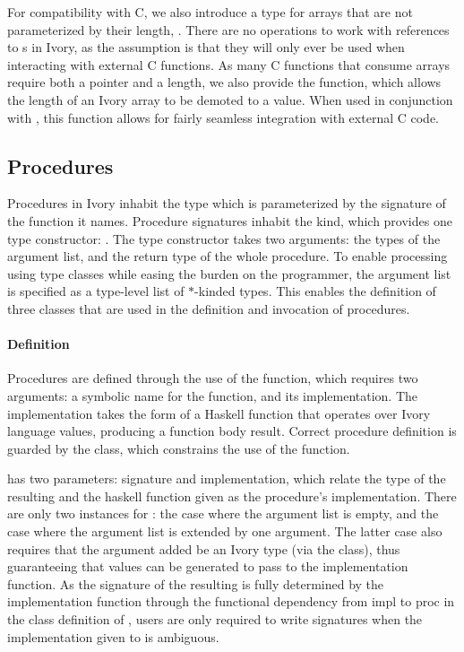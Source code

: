 For compatibility with C, we also introduce a type for arrays that are not
parameterized by their length, .  There are no operations to work
with references to s in Ivory, as the assumption is that they will
only ever be used when interacting with external C functions.  As many C
functions that consume arrays require both a pointer and a length, we also
provide the  function, which allows the length of an Ivory array to
be demoted to a value.  When used in conjunction with , this
function allows for fairly seamless integration with external C code.

\subsection{Procedures}
Procedures in Ivory inhabit the  type which is parameterized by the
signature of the function it names.  Procedure signatures inhabit the 
kind, which provides one type constructor: \cd{:->}.  The \cd{:->} type
constructor takes two arguments: the types of the argument list, and the return
type of the whole procedure.  To enable processing using type classes while
easing the burden on the programmer, the argument list is specified as a
type-level list of $*$-kinded types.  This enables the definition of three
classes that are used in the definition and invocation of procedures.

\paragraph{Definition} Procedures are defined through the use of the 
function, which requires two arguments: a symbolic name for the function, and
its implementation.  The implementation takes the form of a Haskell function
that operates over Ivory language values, producing a function body result.
Correct procedure definition is guarded by the  class, which
constrains the use of the  function.

 has two parameters: signature and implementation, which relate
the  type of the resulting  and the haskell function given as
the procedure's implementation.  There are only two instances for
: the case where the argument list is empty, and the case where
the argument list is extended by one argument.  The latter case also requires
that the argument added be an Ivory type (via the  class), thus
guaranteeing that values can be generated to pass to the implementation
function.   As the signature of the resulting  is fully determined by
the implementation function through the functional dependency from impl to proc
in the class definition of , users are only required to write
signatures when the implementation given to  is ambiguous.

